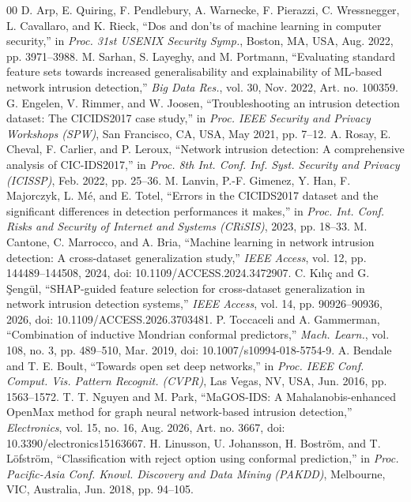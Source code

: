 ﻿\documentclass[conference]{IEEEtran}
\begin{document}
\begin{thebibliography}{00}
 D. Arp, E. Quiring, F. Pendlebury, A. Warnecke, F. Pierazzi, C. Wressnegger, L. Cavallaro, and K. Rieck, ``Dos and don'ts of machine learning in computer security,'' in \textit{Proc. 31st USENIX Security Symp.}, Boston, MA, USA, Aug. 2022, pp. 3971--3988.
 M. Sarhan, S. Layeghy, and M. Portmann, ``Evaluating standard feature sets towards increased generalisability and explainability of ML-based network intrusion detection,'' \textit{Big Data Res.}, vol. 30, Nov. 2022, Art. no. 100359.
 G. Engelen, V. Rimmer, and W. Joosen, ``Troubleshooting an intrusion detection dataset: The CICIDS2017 case study,'' in \textit{Proc. IEEE Security and Privacy Workshops (SPW)}, San Francisco, CA, USA, May 2021, pp. 7--12.
 A. Rosay, E. Cheval, F. Carlier, and P. Leroux, ``Network intrusion detection: A comprehensive analysis of CIC-IDS2017,'' in \textit{Proc. 8th Int. Conf. Inf. Syst. Security and Privacy (ICISSP)}, Feb. 2022, pp. 25--36.
 M. Lanvin, P.-F. Gimenez, Y. Han, F. Majorczyk, L. M\'e, and E. Totel, ``Errors in the CICIDS2017 dataset and the significant differences in detection performances it makes,'' in \textit{Proc. Int. Conf. Risks and Security of Internet and Systems (CRiSIS)}, 2023, pp. 18--33.
 M. Cantone, C. Marrocco, and A. Bria, ``Machine learning in network intrusion detection: A cross-dataset generalization study,'' \textit{IEEE Access}, vol. 12, pp. 144489--144508, 2024, doi: 10.1109/ACCESS.2024.3472907.
 C. K\i l\i \c{c} and G. \c{S}eng\"ul, ``SHAP-guided feature selection for cross-dataset generalization in network intrusion detection systems,'' \textit{IEEE Access}, vol. 14, pp. 90926--90936, 2026, doi: 10.1109/ACCESS.2026.3703481.
 P. Toccaceli and A. Gammerman, ``Combination of inductive Mondrian conformal predictors,'' \textit{Mach. Learn.}, vol. 108, no. 3, pp. 489--510, Mar. 2019, doi: 10.1007/s10994-018-5754-9.
 A. Bendale and T. E. Boult, ``Towards open set deep networks,'' in \textit{Proc. IEEE Conf. Comput. Vis. Pattern Recognit. (CVPR)}, Las Vegas, NV, USA, Jun. 2016, pp. 1563--1572.
 T. T. Nguyen and M. Park, ``MaGOS-IDS: A Mahalanobis-enhanced OpenMax method for graph neural network-based intrusion detection,'' \textit{Electronics}, vol. 15, no. 16, Aug. 2026, Art. no. 3667, doi: 10.3390/electronics15163667.
 H. Linusson, U. Johansson, H. Bostr\"om, and T. L\"ofstr\"om, ``Classification with reject option using conformal prediction,'' in \textit{Proc. Pacific-Asia Conf. Knowl. Discovery and Data Mining (PAKDD)}, Melbourne, VIC, Australia, Jun. 2018, pp. 94--105.

\end{thebibliography}
\end{document}
